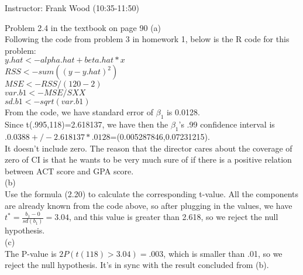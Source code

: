 \documentclass[12pt]{article}
\begin{document}
 \begin{center}
  Instructor: Frank Wood (10:35-11:50)
 \end{center}
{}
\finishfirstpage



 { Problem 2.4 in the textbook on page 90}
 { \vfill
  \answer
} {
(a)\\
Following the code from problem 3 in homework 1, below is the R code for this problem:\\
$y.hat <- alpha.hat+beta.hat*x$\\
$RSS <- sum((y-y.hat)^2)$\\
$MSE <- RSS/(120-2)$\\
$var.b1 <- MSE/SXX$\\
$sd.b1 <- sqrt(var.b1)$\\
From the code, we have standard error of $\beta_1$ is 0.0128.\\
Since t(.995,118)=2.618137, we have then the $\beta_1$'s .99 confidence interval is $.0.0388+/-2.618137*.0128$=(0.005287846,0.07231215).\\
It doesn't include zero. The reason that the director cares about the coverage of zero of CI is that he wants to be very much sure of if there is a positive relation between ACT score and GPA score.\\
(b)\\
Use the formula (2.20) to calculate the corresponding t-value. All the components are already known from the code above, so after plugging in the values, we have
$t^\ast=\frac{b_1-0}{sd(b_1)}=3.04$, and this value is greater than 2.618, so we reject the null hypothesis.\\
(c)\\
The P-value is $2P(t(118)>3.04)=.003$, which is smaller than .01, so we reject the null hypothesis. It's in sync with the result concluded from (b).
}
\end{document}
